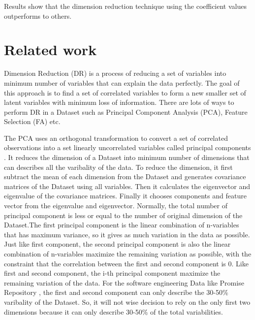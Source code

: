 \documentclass[12pt]{report}
\begin{document}


Results show that the dimension reduction technique using the coefficient values outperforms to others. 



\section{Related work}

Dimension Reduction (DR) is a process of reducing a set of variables into minimum number of variables that can explain the data perfectly. The goal of this approach is to find a set of correlated variables to form a new smaller set of latent variables with minimum loss of information. There are lots of ways to perform DR in a Dataset such as Principal Component Analysis (PCA), Feature Selection (FA) etc.

The PCA uses an orthogonal transformation to convert a set of correlated observations into a set linearly uncorrelated variables called principal components \cite{abdi2010principal,wold1987principal,jolliffe2002principal}. It reduces the dimension of a Dataset into minimum number of dimensions that can describes all the varibality of the data. To reduce the dimension, it first subtract the mean of each dimension from the Dataset and generates covariance matrices of the Dataset using all variables. Then it calculates the eigenvector and eigenvalue of the covariance matrices. Finally it chooses components and feature vector from the eigenvalue and eigenvector. Normally, the total number of principal component is less or equal to the number of original dimension of the Dataset.The first principal component is the linear combination of n-variables that has maximum variance, so it gives as much variation in the data as possible. Just like first component, the second principal component is also the linear combination of n-variables maximize the remaining variation as possible, with the constraint that the correlation between the first and second component is $0$. Like first and second component, the i-th principal component maximize the remaining variation of the data. For the software engineering Data like Promise Repository \cite{promise12}, the first and second component can only describe the 30-50\% varibality of the Dataset. So, it will not wise decision to rely on the only first two dimensions because it can only describe 30-50\% of the total variabilities.


\end{document}
